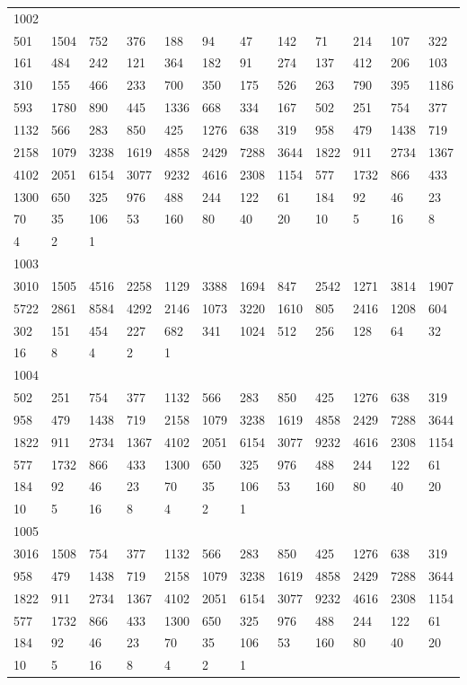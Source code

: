 \begin{longtable}{llllllllllll}
1002&&&&&&&&&&&\\
501& 1504& 752& 376& 188& 94& 47& 142& 71& 214& 107& 322\\
161& 484& 242& 121& 364& 182& 91& 274& 137& 412& 206& 103\\
310& 155& 466& 233& 700& 350& 175& 526& 263& 790& 395& 1186\\
593& 1780& 890& 445& 1336& 668& 334& 167& 502& 251& 754& 377\\
1132& 566& 283& 850& 425& 1276& 638& 319& 958& 479& 1438& 719\\
2158& 1079& 3238& 1619& 4858& 2429& 7288& 3644& 1822& 911& 2734& 1367\\
4102& 2051& 6154& 3077& 9232& 4616& 2308& 1154& 577& 1732& 866& 433\\
1300& 650& 325& 976& 488& 244& 122& 61& 184& 92& 46& 23\\
70& 35& 106& 53& 160& 80& 40& 20& 10& 5& 16& 8\\
4& 2& 1& \\

1003&&&&&&&&&&&\\
3010& 1505& 4516& 2258& 1129& 3388& 1694& 847& 2542& 1271& 3814& 1907\\
5722& 2861& 8584& 4292& 2146& 1073& 3220& 1610& 805& 2416& 1208& 604\\
302& 151& 454& 227& 682& 341& 1024& 512& 256& 128& 64& 32\\
16& 8& 4& 2& 1& \\

1004&&&&&&&&&&&\\
502& 251& 754& 377& 1132& 566& 283& 850& 425& 1276& 638& 319\\
958& 479& 1438& 719& 2158& 1079& 3238& 1619& 4858& 2429& 7288& 3644\\
1822& 911& 2734& 1367& 4102& 2051& 6154& 3077& 9232& 4616& 2308& 1154\\
577& 1732& 866& 433& 1300& 650& 325& 976& 488& 244& 122& 61\\
184& 92& 46& 23& 70& 35& 106& 53& 160& 80& 40& 20\\
10& 5& 16& 8& 4& 2& 1& \\

1005&&&&&&&&&&&\\
3016& 1508& 754& 377& 1132& 566& 283& 850& 425& 1276& 638& 319\\
958& 479& 1438& 719& 2158& 1079& 3238& 1619& 4858& 2429& 7288& 3644\\
1822& 911& 2734& 1367& 4102& 2051& 6154& 3077& 9232& 4616& 2308& 1154\\
577& 1732& 866& 433& 1300& 650& 325& 976& 488& 244& 122& 61\\
184& 92& 46& 23& 70& 35& 106& 53& 160& 80& 40& 20\\
10& 5& 16& 8& 4& 2& 1& \\


\end{longtable}
